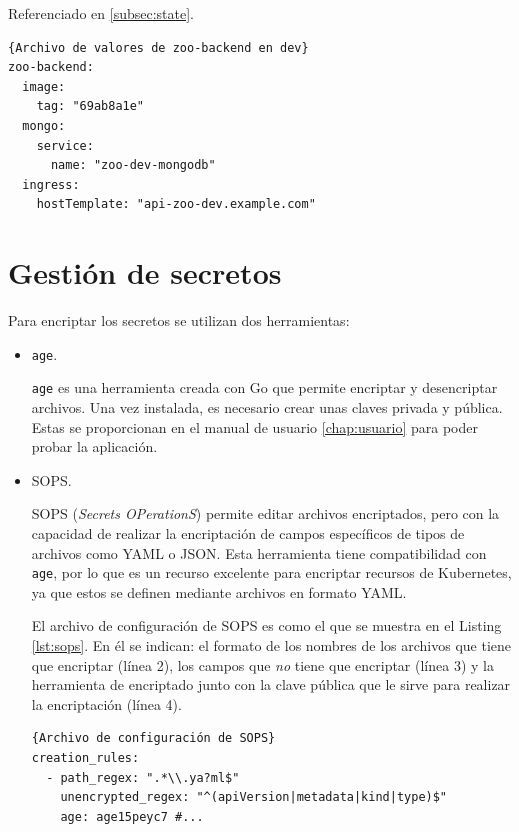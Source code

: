 Referenciado en \ref{subsec:state}.

\begin{lstlisting}[label=lst:values]{Archivo de valores de zoo-backend en dev}
zoo-backend:
  image:
    tag: "69ab8a1e"
  mongo:
    service:
      name: "zoo-dev-mongodb"
  ingress:
    hostTemplate: "api-zoo-dev.example.com"
\end{lstlisting}

\clearpage

\section{Gestión de secretos}
\label{sec:secrets}

Para encriptar los secretos se utilizan dos herramientas:

\begin{itemize}
  \item \texttt{age}\cite{age}.

    \texttt{age} es una herramienta creada con Go que permite encriptar y desencriptar archivos. Una vez instalada, es necesario crear unas claves privada y pública. Estas se proporcionan en el manual de usuario \ref{chap:usuario} para poder probar la aplicación.
  \item SOPS\cite{sops}.

    SOPS (\textit{Secrets OPerationS}) permite editar archivos encriptados, pero con la capacidad de realizar la encriptación de campos específicos de tipos de archivos como YAML o JSON. Esta herramienta tiene compatibilidad con \texttt{age}, por lo que es un recurso excelente para encriptar recursos de Kubernetes, ya que estos se definen mediante archivos en formato YAML.

    El archivo de configuración de SOPS es como el que se muestra en el Listing \ref{lst:sops}. En él se indican: el formato de los nombres de los archivos que tiene que encriptar (línea 2), los campos que \textit{no} tiene que encriptar (línea 3) y la herramienta de encriptado junto con la clave pública que le sirve para realizar la encriptación (línea 4).

\begin{lstlisting}[language=helm,label=lst:sops]{Archivo de configuración de SOPS}
creation_rules:
  - path_regex: ".*\\.ya?ml$"
    unencrypted_regex: "^(apiVersion|metadata|kind|type)$"
    age: age15peyc7 #...
\end{lstlisting}

\end{itemize}

